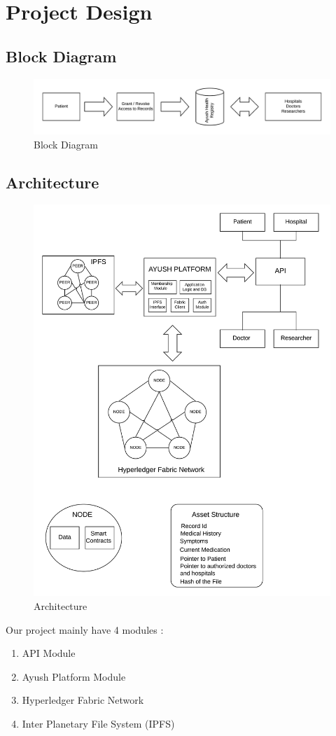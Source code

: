 \documentclass[11pt]{report}
\begin{document}
\chapter{Project Design}
\section{Block Diagram}
    \begin{figure}[h!]
        \centering
        \includegraphics[scale=0.8]{Block.jpeg}
        \caption{Block Diagram}
        \label{fig:my_label}
    \end{figure}
    \newpage
\section{Architecture}        
\begin{figure}[h!]
        \centering
        \includegraphics[scale=0.7]{arch.jpeg}
        \caption{Architecture}
        \label{fig:my_label}
    \end{figure} 
Our project mainly have 4 modules :
\begin{enumerate}
    \item API Module
    \item Ayush Platform Module
    \item Hyperledger Fabric Network
    \item Inter Planetary File System (IPFS) 
\end{enumerate}
\end{document}
